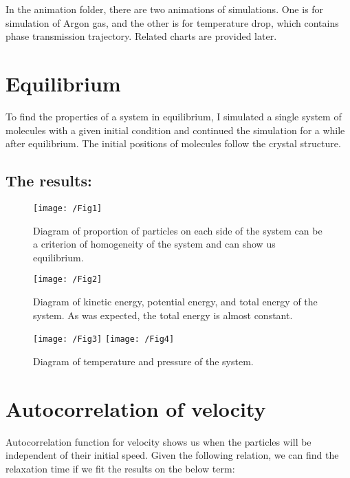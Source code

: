 \documentclass{article}
\begin{document}
    In the animation folder, there are two animations of simulations.
    One is for simulation of Argon gas, and the other is for temperature drop, which contains phase transmission trajectory.
    Related charts are provided later.

    \section*{Equilibrium}

    To find the properties of a system in equilibrium, I simulated a single system of molecules with a given initial condition and continued the simulation for a while after equilibrium.
    The initial positions of molecules follow the crystal structure.

    \subsection*{The results:}

    \begin{figure}[!htb]
        \centering
        \texttt{[image: /Fig1]}
        \label{fig.1}
        \caption{Diagram of proportion of particles on each side of the system can be a criterion of homogeneity of the system and can show us equilibrium.}
    \end{figure}

    \begin{figure}[!htb]
        \centering
        \texttt{[image: /Fig2]}
        \label{fig.2}
        \caption{Diagram of kinetic energy, potential energy, and total energy of the system. As was expected, the total energy is almost constant.}
    \end{figure}

    \begin{figure}[!htb]
        \centering
        \texttt{[image: /Fig3]}
        \label{fig.3}
        \texttt{[image: /Fig4]}
        \label{fig.4}
        \caption{Diagram of temperature and pressure of the system.}
    \end{figure}

    \section*{Autocorrelation of velocity}
    
    Autocorrelation function for velocity shows us when the particles will be independent of their initial speed. Given the following relation, we can find the relaxation time if we fit the results on the below term:
\end{document}
